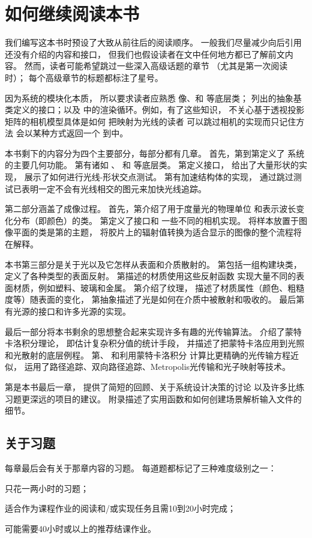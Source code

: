 \section{如何继续阅读本书}\label{sec:如何继续阅读本书}
我们编写这本书时预设了大致从前往后的阅读顺序。
一般我们尽量减少向后引用还没有介绍的内容和接口，
但我们也假设读者在文中任何地方都已了解前文内容。
然而，读者可能希望跳过一些深入高级话题的章节
（尤其是第一次阅读时）；
每个高级章节的标题都标注了星号。

因为系统的模块化本质，
所以要求读者应熟悉
像、和
等底层类；
列出的抽象基类定义的接口；以及
中的渲染循环。例如，有了这些知识，
不关心基于透视投影矩阵的相机模型具体是如何
把映射为光线的读者
可以跳过相机的实现而只记住方法
会以某种方式返回一个
到中。

本书剩下的内容分为四个主要部分，每部分都有几章。
首先，第到第定义了
系统的主要几何功能。
第有诸如
、
和
等底层类。
第定义接口，
给出了大量形状的实现，
展示了如何进行光线-形状交点测试。
第有加速结构体的实现，
通过跳过测试已表明一定不会有光线相交的图元来加快光线追踪。

第二部分涵盖了成像过程。
首先，第介绍了用于度量光的物理单位
和表示波长变化分布（即颜色）的类。
第定义了接口和
一些不同的相机实现。
将样本放置于图像平面的类是第的主题，
将胶片上的辐射值转换为适合显示的图像的整个流程将在解释。

本书第三部分是关于光以及它怎样从表面和介质散射的。
第包括一组构建块类，
定义了各种类型的表面反射。
第描述的材质使用这些反射函数
实现大量不同的表面材质，例如塑料、玻璃和金属。
第介绍了纹理，
描述了材质属性（颜色、粗糙度等）随表面的变化，
第抽象描述了光是如何在介质中被散射和吸收的。
最后第有光源的接口和许多光源的实现。

最后一部分将本书剩余的思想整合起来实现许多有趣的光传输算法。
介绍了蒙特卡洛积分理论，
即估计复杂积分值的统计手段，
并描述了把蒙特卡洛应用到光照和光散射的底层例程。
第、
和利用蒙特卡洛积分
计算比更精确的光传输方程近似，
运用了路径追踪、双向路径追踪、Metropolis光传输和光子映射等技术。

第是本书最后一章，
提供了简短的回顾、关于系统设计决策的讨论
以及许多比练习题更深远的项目的建议。
附录描述了实用函数和如何创建场景解析输入文件的细节。

\subsection{关于习题}\label{sub:关于习题}
每章最后会有关于那章内容的习题。
每道题都标记了三种难度级别之一：

\circleone 只花一两小时的习题；

\circletwo 适合作为课程作业的阅读和/或实现任务且需10到20小时完成；

\circlethree 可能需要40小时或以上的推荐结课作业。